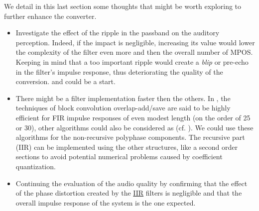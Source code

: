 We detail in this last section some thoughts that might be worth exploring to further enhance the converter.
\begin{itemize}

\item Investigate the effect of the ripple in the passband on the auditory perception. Indeed, if the impact is negligible, increasing its value would lower the complexity of the filter even more and then the overall number of MPOS. Keeping in mind that a too important ripple would create a \textit{blip} or pre-echo in the filter's impulse response, thus deteriorating the quality of the conversion. \cite{ripple1} and \cite{ripple2} could be a start. 
\item There might be a filter implementation faster then the others. In \cite{Oppenheim}, the techniques of block convolution overlap-add/save are said to be highly efficient for FIR impulse responses of even modest length (on the order of 25 or 30), other algorithms could also be considered as (cf. \cite{ffa}). We could use these algorithms for the non-recursive polyphase components. The recursive part (IIR) can be implemented using the other structures, like a second order sections to avoid potential numerical problems caused by coefficient quantization.
\item Continuing the evaluation of the audio quality by confirming that the effect of the phase distortion created by the \hyperlink{IIR}{IIR} filters is negligible and that the overall impulse response of the system is the one expected. 

\end{itemize}





